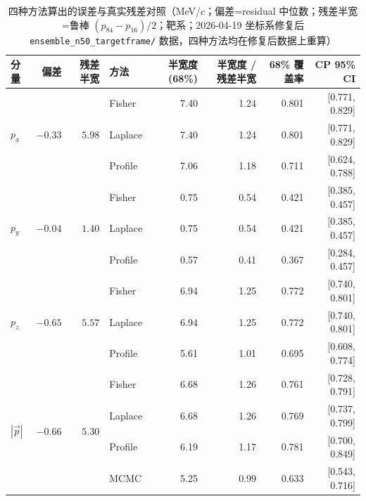 \documentclass[a4paper, 11pt]{article}
\begin{document}
\begin{table}[H]
\centering\scriptsize
\caption{四种方法算出的误差与真实残差对照（MeV/$c$；偏差=residual 中位数；残差半宽=鲁棒 $(p_{84}-p_{16})/2$；靶系；2026-04-19 坐标系修复后 \texttt{ensemble\_n50\_targetframe/} 数据，四种方法均在修复后数据上重算）}
\begin{tabular}{lrrlrrrr}
\toprule
分量 & 偏差 & 残差半宽 & 方法 & 半宽度 (68\%) & 半宽度 / 残差半宽 & 68\% 覆盖率 & CP 95\% CI \\
\midrule
\multirow{3}{*}{$p_x$} & \multirow{3}{*}{$-0.33$} & \multirow{3}{*}{$5.98$}
  & Fisher  & 7.40  & 1.24 & 0.801 & [0.771, 0.829] \\
  & & & Laplace & 7.40  & 1.24 & 0.801 & [0.771, 0.829] \\
  & & & Profile & 7.06  & 1.18 & 0.711 & [0.624, 0.788] \\
\midrule
\multirow{3}{*}{$p_y$} & \multirow{3}{*}{$-0.04$} & \multirow{3}{*}{$1.40$}
  & Fisher  & 0.75 & 0.54 & 0.421 & [0.385, 0.457] \\
  & & & Laplace & 0.75 & 0.54 & 0.421 & [0.385, 0.457] \\
  & & & Profile & 0.57 & 0.41 & 0.367 & [0.284, 0.457] \\
\midrule
\multirow{3}{*}{$p_z$} & \multirow{3}{*}{$-0.65$} & \multirow{3}{*}{$5.57$}
  & Fisher  & 6.94 & 1.25 & 0.772 & [0.740, 0.801] \\
  & & & Laplace & 6.94 & 1.25 & 0.772 & [0.740, 0.801] \\
  & & & Profile & 5.61 & 1.01 & 0.695 & [0.608, 0.774] \\
\midrule
\multirow{4}{*}{$|\vec{p}|$} & \multirow{4}{*}{$-0.66$} & \multirow{4}{*}{$5.30$}
  & Fisher  & 6.68 & 1.26 & 0.761 & [0.728, 0.791] \\
  & & & Laplace & 6.68 & 1.26 & 0.769 & [0.737, 0.799] \\
  & & & Profile & 6.19 & 1.17 & 0.781 & [0.700, 0.849] \\
  & & & MCMC    & 5.25 & 0.99 & 0.633 & [0.543, 0.716] \\
\bottomrule
\end{tabular}
\end{table}
\end{document}
